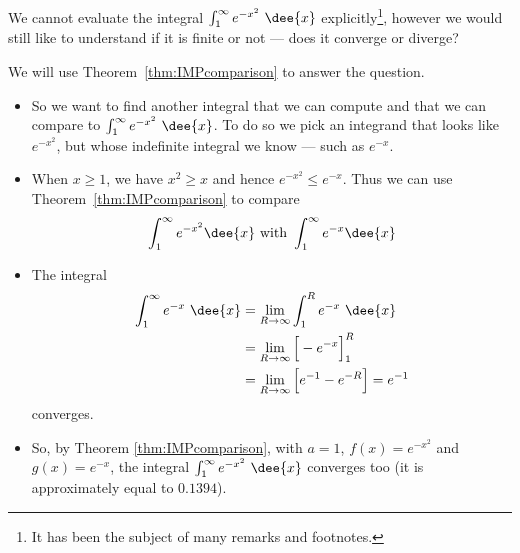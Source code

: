 \begin{eg}\label{eg:IMPp6}
We cannot evaluate the integral $\int_1^\infty e^{-x^2}\ \dee{x}$
explicitly\footnote{It has been the subject of many remarks and footnotes.},
however we would still like to understand if it is finite or not --- does it
converge or diverge?

\soln We will use Theorem~\ref{thm:IMPcomparison} to answer the question.
\begin{itemize}
 \item So we want to find another integral that we can compute and that we can
compare to $\int_1^\infty e^{-x^2}\ \dee{x}$. To do so we pick an integrand
that looks like $e^{-x^2}$, but whose indefinite integral we know ---
such as $e^{-x}$.

\item When $x\ge 1$, we have $x^2\ge x$ and hence $e^{-x^2}\le e^{-x}$. Thus we
can use Theorem~\ref{thm:IMPcomparison} to compare
\begin{align*}
  \int_1^\infty e^{-x^2}\dee{x} \text{ with }
\int_1^\infty e^{-x}\dee{x}
\end{align*}

\item The integral
\begin{align*}
\int_1^\infty e^{-x}\ \dee{x}
&=\lim_{R\rightarrow\infty}\int_1^R e^{-x}\ \dee{x}\\
&=\lim_{R\rightarrow\infty}\Big[-e^{-x}\Big]_1^{R}\\
&=\lim_{R\rightarrow\infty}\Big[e^{-1}-e^{-R}\Big]
=e^{-1}
\end{align*}
converges.
\item So, by Theorem \ref{thm:IMPcomparison}, with $a=1$,
$f(x)=e^{-x^2}$ and $g(x)=e^{-x}$, the integral $\int_1^\infty e^{-x^2}\ \dee{x}$
converges too (it is approximately equal to $0.1394$).
\end{itemize}
\end{eg}



